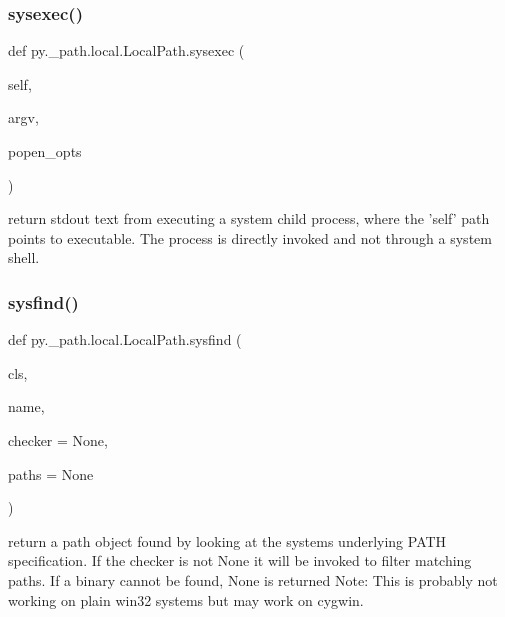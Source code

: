 \subsubsection{\texorpdfstring{sysexec()}{sysexec()}}
{\footnotesize\ttfamily def py.\+\_\+path.\+local.\+Local\+Path.\+sysexec (\begin{DoxyParamCaption}\item[{}]{self,  }\item[{}]{argv,  }\item[{}]{popen\+\_\+opts }\end{DoxyParamCaption})}

\begin{DoxyVerb}return stdout text from executing a system child process,
    where the 'self' path points to executable.
    The process is directly invoked and not through a system shell.
\end{DoxyVerb}
 \mbox{\label{classpy_1_1__path_1_1local_1_1_local_path_a97eccf10d053e1a47acf4f64e9301406}} 
\subsubsection{\texorpdfstring{sysfind()}{sysfind()}}
{\footnotesize\ttfamily def py.\+\_\+path.\+local.\+Local\+Path.\+sysfind (\begin{DoxyParamCaption}\item[{}]{cls,  }\item[{}]{name,  }\item[{}]{checker = {\ttfamily None},  }\item[{}]{paths = {\ttfamily None} }\end{DoxyParamCaption})}

\begin{DoxyVerb}return a path object found by looking at the systems
    underlying PATH specification. If the checker is not None
    it will be invoked to filter matching paths.  If a binary
    cannot be found, None is returned
    Note: This is probably not working on plain win32 systems
    but may work on cygwin.
\end{DoxyVerb}
 \mbox{\label{classpy_1_1__path_1_1local_1_1_local_path_a459df71cb1de18072af3f519bb5291f3}} 
